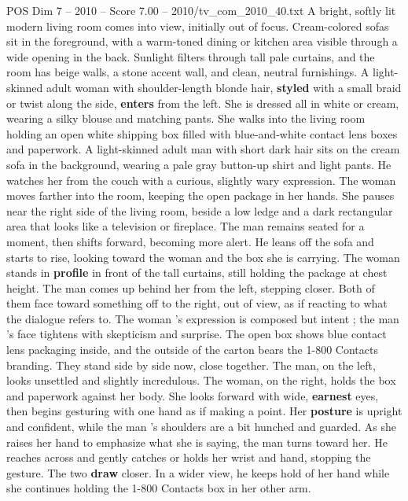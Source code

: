 \begin{textsample}{POS Dim 7 – 2010 – Score 7.00 – 2010/tv\_com\_2010\_40.txt}  \label{ex:f7_pos_058}
A bright, softly lit modern living room comes into view, initially out of focus.
Cream-colored sofas sit in the foreground, with a warm-toned dining or kitchen area visible through a wide opening in the back.
Sunlight filters through tall pale curtains, and the room has beige walls, a stone accent wall, and clean, neutral furnishings.
A light-skinned adult woman with shoulder-length blonde hair, \textbf{styled} with a small braid or twist along the side, \textbf{enters} from the left.
She is dressed all in white or cream, wearing a silky blouse and matching pants.
She walks into the living room holding an open white shipping box filled with blue-and-white contact lens boxes and paperwork.
A light-skinned adult man with short dark hair sits on the cream sofa in the background, wearing a pale gray button-up shirt and light pants.
He watches her from the couch with a curious, slightly wary expression.
The woman moves farther into the room, keeping the open package in her hands.
She pauses near the right side of the living room, beside a low ledge and a dark rectangular area that looks like a television or fireplace.
The man remains seated for a moment, then shifts forward, becoming more alert.
He leans off the sofa and starts to rise, looking toward the woman and the box she is carrying.
The woman stands in \textbf{profile} in front of the tall curtains, still holding the package at chest height.
The man comes up behind her from the left, stepping closer.
Both of them face toward something off to the right, out of view, as if reacting to what the dialogue refers to.
The woman ’s expression is composed but intent ; the man ’s face tightens with skepticism and surprise.
The open box shows blue contact lens packaging inside, and the outside of the carton bears the 1-800 Contacts branding.
They stand side by side now, close together.
The man, on the left, looks unsettled and slightly incredulous.
The woman, on the right, holds the box and paperwork against her body.
She looks forward with wide, \textbf{earnest} eyes, then begins gesturing with one hand as if making a point.
Her \textbf{posture} is upright and confident, while the man ’s shoulders are a bit hunched and guarded.
As she raises her hand to emphasize what she is saying, the man turns toward her.
He reaches across and gently catches or holds her wrist and hand, stopping the gesture.
The two \textbf{draw} closer.
In a wider view, he keeps hold of her hand while she continues holding the 1-800 Contacts box in her other arm.

\end{textsample}
